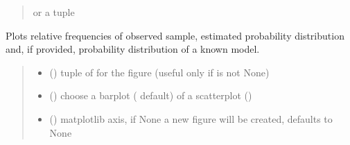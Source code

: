 \documentclass[letterpaper,10pt,english]{sphinxmanual}
\begin{document}
\begin{fulllineitems}
\begin{fulllineitems}
\begin{quote}
\begin{description}
\begin{itemize}
\end{itemize}

\sphinxAtStartPar
{} or a tuple 

\end{description}\end{quote}

\end{fulllineitems}


\begin{fulllineitems}
\label{\detokenize{cubmods:cubmods.cush.CUBresCUSH.plot_ordinal}}
\pysigstartsignatures
{}
\pysigstopsignatures
\sphinxAtStartPar
Plots relative frequencies of observed sample, estimated probability distribution and,
if provided, probability distribution of a known model.
\begin{quote}\begin{description}
\begin{itemize}
\item {} 
\sphinxAtStartPar
{} () \textendash{} tuple of  for the figure (useful only if  is not None)

\item {} 
\sphinxAtStartPar
{} () \textendash{} choose a barplot ( default) of a scatterplot ()

\item {} 
\sphinxAtStartPar
{} (\sphinxstyleliteralemphasis{\sphinxupquote{, }}) \textendash{} matplotlib axis, if None a new figure will be created, defaults to None


\end{itemize}
\end{description}
\end{quote}
\end{fulllineitems}
\end{fulllineitems}
\end{document}
